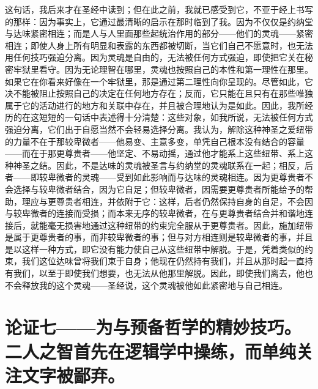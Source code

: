 这句话，我后来才在圣经中读到；但在此之前，我就已感受到它，不亚于经上书写的那样：因为事实上，它通过最清晰的启示在那时临到了我。因为不仅仅是约纳堂与达味紧密相连；而是人与人里面那些起统治作用的部分——他们的灵魂——紧密相连；即使人身上所有明显和表露的东西都被切断，当它们自己不愿意时，也无法用任何技巧强迫分离。因为灵魂是自由的，无法被任何方式强迫，即使把它关在秘密牢狱里看守。因为无论理智在哪里，灵魂也按照自己的本性和第一理性在那里。如果它在你看来好像在一个牢狱里，那是通过第二理性向你呈现的。尽管如此，它决不能被阻止按照自己的决定在任何地方存在；反而，它只能在且只有在那些唯独属于它的活动进行的地方和关联中存在，并且被合理地认为是如此。因此，我所经历的在这短短的一句话中表述得十分清楚：这些对象，如我所说，无法被任何方式强迫分离，它们出于自愿当然不会轻易选择分离。我认为，解除这种神圣之爱纽带的力量不在于那较卑微者——他易变、主意多变，单凭自己根本没有结合的容量——而在于那更尊贵者——他坚定、不易动摇，通过他才能系上这些纽带、系上这种神圣之结。因此，不是达味的灵魂被圣言与约纳堂的灵魂联系在一起；相反，后者——即较卑微者的灵魂——受到如此影响而与达味的灵魂相连。因为更尊贵者不会选择与较卑微者结合，因为它自足；但较卑微者，因需要更尊贵者所能给予的帮助，理应与更尊贵者相连，并依附于它：这样，后者仍然保持自身的自足，不会因与较卑微者的连接而受损；而本来无序的较卑微者，在与更尊贵者结合并和谐地连接后，就能毫无损害地通过这种纽带的约束完全服从于更尊贵者。因此，施加纽带是属于更尊贵者的事，而非较卑微者的事；但与对方相连则是较卑微者的事，并且是以这样一种方式，即它没有能力使自己从这些纽带中解脱。于是，凭着类似的约束，我们这位达味曾将我们束于自身；他现在仍然持有我们，并且从那时起一直持有我们，以至于即使我们想要，也无法从他那里解脱。因此，即使我们离去，他也不会释放我的这个灵魂——圣经说，这个灵魂被他如此紧密地与自己相连。\par


\section{论证七——为与预备哲学的精妙技巧。二人之智首先在逻辑学中操练，而单纯关注文字被鄙弃。}

